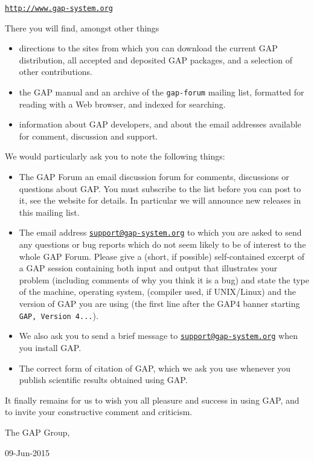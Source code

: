 \documentclass[a4paper,11pt]{report}
\begin{document}
{{ \href{http://www.gap-system.org} {\texttt{http://www.gap-system.org}} 

 There you will find, amongst other things 
\begin{itemize}
\item  directions to the sites from which you can download the current \textsf{GAP} distribution, all accepted and deposited \textsf{GAP} packages, and a selection of other contributions. 
\item  the \textsf{GAP} manual and an archive of the \texttt{gap-forum} mailing list, formatted for reading with a Web browser, and indexed for
searching. 
\item  information about \textsf{GAP} developers, and about the email addresses available for comment, discussion
and support. 
\end{itemize}
 

 

 We would particularly ask you to note the following things: 
\begin{itemize}
\item  The \textsf{GAP} Forum {\textendash} an email discussion forum for comments, discussions or
questions about \textsf{GAP}. You must subscribe to the list before you can post to it, see the website
for details. In particular we will announce new releases in this mailing list. 
\item  The email address \href{mailto://support@gap-system.org} {\texttt{support@gap-system.org}} to which you are asked to send any questions or bug reports which do not seem
likely to be of interest to the whole \textsf{GAP} Forum. Please give a (short, if possible) self-contained excerpt of a \textsf{GAP} session containing both input and output that illustrates your problem
(including comments of why you think it is a bug) and state the type of the
machine, operating system, (compiler used, if UNIX/Linux) and the version of \textsf{GAP} you are using (the first line after the \textsf{GAP}{\nobreakspace}4 banner starting \texttt{GAP, Version 4...}). 
\item  We also ask you to send a brief message to \href{mailto://support@gap-system.org} {\texttt{support@gap-system.org}} when you install \textsf{GAP}. 
\item  The correct form of citation of \textsf{GAP}, which we ask you use whenever you publish scientific results obtained using \textsf{GAP}. 
\end{itemize}
 

 It finally remains for us to wish you all pleasure and success in using \textsf{GAP}, and to invite your constructive comment and criticism. 

 

 

 The GAP Group, 

 09-Jun-2015    }

 }
\end{document}
